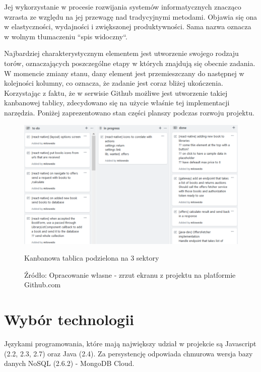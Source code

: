\newpage
Jej wykorzystanie w procesie rozwijania systemów informatycznych znacząco wzrasta ze względu na jej przewagę nad tradycyjnymi metodami. Objawia się ona w elastyczności, wydajności i zwiększonej produktywności. Sama nazwa oznacza w wolnym tłumaczeniu ``spis widoczny``.~\cite{kanban}

Najbardziej charakterystycznym elementem jest utworzenie swojego rodzaju torów, oznaczających poszczególne etapy w których znajdują się obecnie zadania. W momencie zmiany stanu, dany element jest przemieszczany do następnej w kolejności kolumny, co oznacza, że zadanie jest coraz bliżej ukończenia.\newline
Korzystając z faktu, że w serwisie Github możliwe jest utworzenie takiej kanbanowej tablicy, zdecydowano się na użycie właśnie tej implementacji narzędzia. Poniżej zaprezentowano stan części planszy podczas rozwoju projektu.
\begin{figure}[H]
	\centering
	\includegraphics[width=\linewidth]{kanban.pdf}
	\caption{\centering Kanbanowa tablica podzielona na 3 sektory}
	\caption*{\centering Źródło: {Opracowanie własne - zrzut ekranu z projektu na platformie Github.com}}
\end{figure}

\newpage
\section{Wybór technologii}
Językami programowania, które mają największy udział w projekcie są Javascript (2.2, 2.3, 2.7) oraz Java (2.4).\newline
Za persystencję odpowiada chmurowa wersja bazy danych NoSQL (2.6.2) - MongoDB Cloud.

